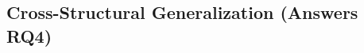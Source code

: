 \documentclass[paper=a4, fontsize=11pt]{scrartcl} %
\numberwithin{equation}{section} %
\numberwithin{figure}{section} %
\numberwithin{table}{section} %
\begin{document}


\subsection{Cross-Structural Generalization (Answers RQ4)}
\end{document}
